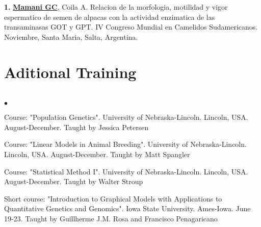 \documentclass[margin,line,10pt]{res}
\newenvironment{list1}{
  \begin{list}{\ding{113}}{%
      \setlength{\itemsep}{0in}
      \setlength{\parsep}{0in} \setlength{\parskip}{0in}
      \setlength{\topsep}{0in} \setlength{\partopsep}{0in} 
      \setlength{\leftmargin}{0.17in}}}{\end{list}}
\newenvironment{list2}{
  \begin{list}{$\bullet$}{%
      \setlength{\itemsep}{0in}
      \setlength{\parsep}{0in} \setlength{\parskip}{0in}
      \setlength{\topsep}{0in} \setlength{\partopsep}{0in} 
      \setlength{\leftmargin}{0.2in}}}{\end{list}}
\begin{document}
\begin{resume}
\section{}
\begin{list1}
\item [\bf{1}.] {\bf \underline{Mamani GC}}, Coila A.
Relacion de la morfologia, motilidad y vigor espermatico de semen de alpacas con la actividad enzimatica de las transaminasas GOT y GPT.
IV Congreso Mundial en Camelidos Sudamericanos. Noviembre, Santa Maria, Salta, Argentina. 
\end{list1}

\vspace{0.9cm}
\section{\sc Aditional Training} 
\vspace{2cm}

\section{}
\begin{list2}
\item Course: "Population Genetics". University of Nebraska-Lincoln. Lincoln, USA. August-December. Taught by Jessica Petersen
\vspace{0.5cm}
\item Course: "Linear Models in Animal Breeding". University of Nebraska-Lincoln. Lincoln, USA. August-December. Taught by Matt Spangler
\vspace{0.5cm}
\item Course: "Statistical Method I". University of Nebraska-Lincoln. Lincoln, USA. August-December. Taught by Walter Stroup
\vspace{0.5cm}
\item Short course: "Introduction to Graphical Models with Applications to Quantitative Genetics and Genomics". Iowa State University. Ames-Iowa. June 19-23. Taught by Guillherme J.M. Rosa and Francisco Penagaricano
\vspace{0.5cm}
\end{list2}  

\section{}


\end{resume}
\end{document}

